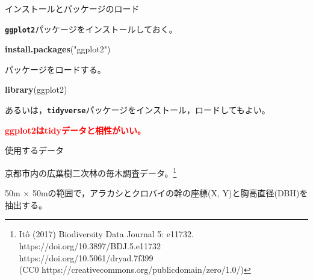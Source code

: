\documentclass[ignorenonframetext,]{beamer}
\newenvironment{Shaded}{\begin{snugshade}}{\end{snugshade}}
\newcommand{\KeywordTok}[1]{\textcolor[rgb]{0.13,0.29,0.53}{\textbf{#1}}}
\newcommand{\StringTok}[1]{\textcolor[rgb]{0.31,0.60,0.02}{#1}}
\newcommand{\NormalTok}[1]{#1}
\let\oldShaded\Shaded
\let\endoldShaded\endShaded
\renewenvironment{Shaded}{\footnotesize\oldShaded}{\endoldShaded}
\begin{document}
\begin{frame}[fragile]{インストールとパッケージのロード}

\textbf{\texttt{ggplot2}}パッケージをインストールしておく。

\begin{Shaded}
\begin{Highlighting}[]
\KeywordTok{install.packages}\NormalTok{(}\StringTok{"ggplot2"}\NormalTok{)}
\end{Highlighting}
\end{Shaded}

パッケージをロードする。

\begin{Shaded}
\begin{Highlighting}[]
\KeywordTok{library}\NormalTok{(ggplot2)}
\end{Highlighting}
\end{Shaded}

あるいは，\textbf{\texttt{tidyverse}}パッケージをインストール，ロードしてもよい。

\vspace{12pt}

\textcolor{red}{\large\bfseries ggplot2はtidyデータと相性がいい。}

\end{frame}

\begin{frame}{使用するデータ}

京都市内の広葉樹二次林の毎木調査データ。\footnote{Itô (2017) Biodiversity Data Journal 5: e11732. \\
\hspace{14pt} https://doi.org/10.3897/BDJ.5.e11732 \\
\hspace{14pt} https://doi.org/10.5061/dryad.7f399 \\
\hspace{14pt} (CC0 https://creativecommons.org/publicdomain/zero/1.0/)}

50m \(\times\) 50mの範囲で，アラカシとクロバイの幹の座標(X,
Y)と胸高直径(DBH)を抽出する。

\end{frame}
\end{document}
